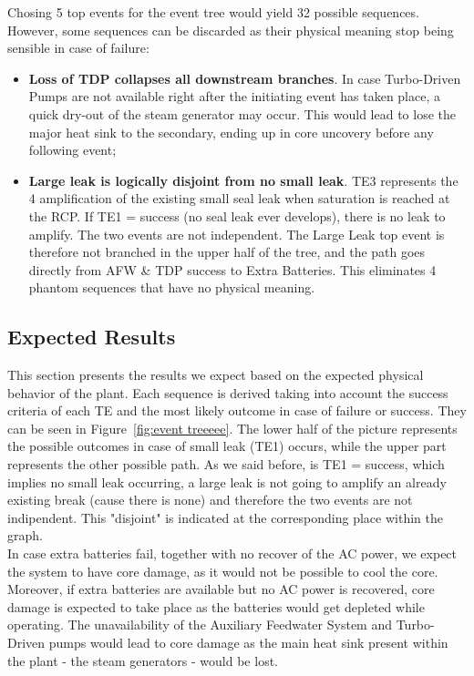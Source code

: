 \documentclass[a4paper,11pt]{article}
\numberwithin{subsubsection}{subsection}
\numberwithin{subsection}{section}
\newcommand{\figref}[1]{Figure~\ref{#1}}
\begin{document}
Chosing 5 top events for the event tree would yield 32 possible sequences. However, some sequences can be discarded as their physical meaning stop being sensible in case of failure: 
\begin{itemize}
    \item \textbf{Loss of TDP collapses all downstream branches}. In case Turbo-Driven Pumps are not available right after the initiating event has taken place, a quick dry-out of the steam generator may occur. This would lead to lose the major heat sink to the secondary, ending up in core uncovery before any following event; 
    \item \textbf{Large leak is logically disjoint from no small leak}.
    TE3 represents the 4 amplification of the existing small seal leak when saturation is reached at the RCP. If TE1 = success (no seal leak ever develops), there is no leak to amplify. The two events are not independent.
    The Large Leak top event is therefore not branched in the upper half of the tree, and the path goes directly from AFW \& TDP success to Extra Batteries. This eliminates 4 phantom sequences that have no physical meaning.
\end{itemize}

\subsection{Expected Results}
This section presents the results we expect based on the expected physical behavior of the plant. Each sequence is derived taking into account the success criteria of each TE and the most likely outcome in case of failure or success. They can be seen in \figref{fig:event treeeee}. The lower half of the picture represents the possible outcomes in case of small leak (TE1) occurs, while the upper part represents the other possible path. As we said before, is TE1 = success, which implies no small leak occurring, a large leak is not going to amplify an already existing break (cause there is none) and therefore the two events are not indipendent. This "disjoint" is indicated at the corresponding place within the graph. \\
In case extra batteries fail, together with no recover of the AC power, we expect the system to have core damage, as it would not be possible to cool the core. Moreover, if extra batteries are available but no AC power is recovered, core damage is expected to take place as the batteries would get depleted while operating. The unavailability of the Auxiliary Feedwater System and Turbo-Driven pumps would lead to core damage as the main heat sink present within the plant - the steam generators - would be lost. \\
\end{document}
